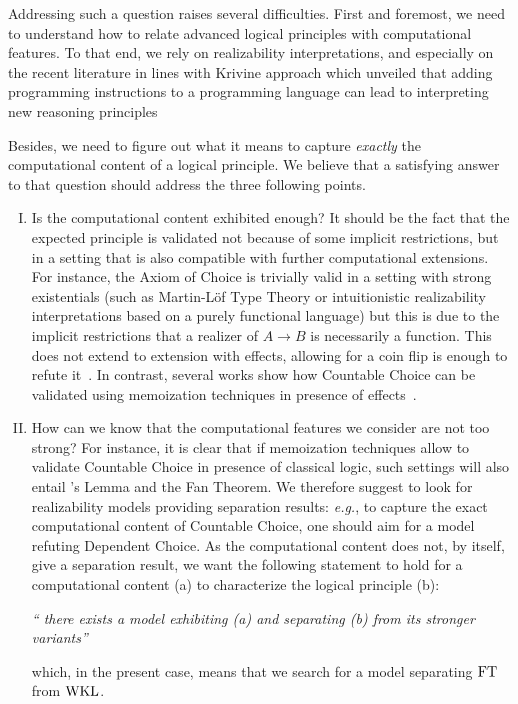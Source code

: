 \documentclass[a4paper,UKenglish,cleveref, autoref, thm-restate]{lipics-v2021}
\begin{document}
Addressing such a question raises several difficulties.
First and foremost, we need to understand how to relate advanced logical principles with computational features.
To that end, we rely on realizability interpretations, and especially on the recent literature in lines with Krivine approach which unveiled that adding programming instructions to a programming language can lead to interpreting new reasoning principles~\cite{Griffin90,Krivine04,Miquel11,Miquey18a,Geoffroy18,CohFarTat19,Blot22}

Besides, we need to figure out what it means to  capture \emph{exactly} the computational content of a logical principle. We believe that a satisfying answer to that question should address the three following points.

\begin{enumerate}[(I)]
\item Is the computational content exhibited enough? It should be the fact that the expected principle is validated not because of some implicit restrictions, but in a setting that is also compatible with further computational extensions.
For instance, the Axiom of Choice is trivially valid in a setting with strong existentials (such as Martin-Löf Type Theory or intuitionistic realizability interpretations based on a purely functional language) but this is due to the implicit restrictions that a realizer of $A\to B$ is necessarily a function. This does not extend to extension with effects, allowing for a coin flip is enough to refute it~\cite{CohFarTat19}. In contrast, several works show how Countable Choice can be validated using memoization techniques in presence of effects~\cite{BerBezCoq98,Herbelin12,Miquey18a,CohFarTat19}.

\item How can we know that the computational features we consider are not too strong? For instance, it is clear that if memoization techniques allow to validate Countable Choice in presence of classical logic, such settings will also entail \Konig's Lemma and the Fan Theorem. We therefore suggest to look for realizability models providing separation results: \emph{e.g.}, to capture the exact computational content of Countable Choice, one should aim for a model refuting Dependent Choice. As the computational content does not, by itself, give a separation result, we want the following statement to hold for a computational content (a) to characterize the logical principle (b):
\begin{center}
\emph{`` there exists a model exhibiting (a) and separating (b) from its stronger variants''}
\end{center}
which, in the present case, means that we search for a model separating $\mathrm{FT}$ from $\mathrm{WKL}$.


\end{enumerate}
\end{document}
